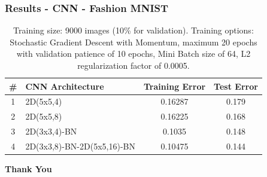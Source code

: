 \documentclass{beamer}
\begin{document}
\begin{frame}
\frametitle{Results - CNN - Fashion MNIST}
\begin{table}[hbt]
  \begin{tabular}{|c|l|c|c|}
  	\hline
    \# & CNN Architecture & Training Error & Test Error\\
    \hline
    \hline
    1 & 2D(5x5,4)   &             0.16287    &  0.179     \\
    2 & 2D(5x5,8)   &            0.16225     & 0.168     \\
   3 & 2D(3x3,4)-BN   &           0.1035      &0.148   \\  
    4 & 2D(3x3,8)-BN-2D(5x5,16)-BN    &           0.10475      &0.144  \\
    \hline
  \end{tabular}
  \vspace{2em}
  \caption{{Training size: 9000 images (10\% for validation). Training options: Stochastic Gradient Descent with Momentum, maximum 20 epochs with validation patience of 10 epochs, Mini Batch size of 64, L2 regularization factor of 0.0005.}}
\end{table}
\end{frame}

\begin{frame}[standout]
	\centering
	\textbf{Thank You}
\end{frame}
\end{document}

